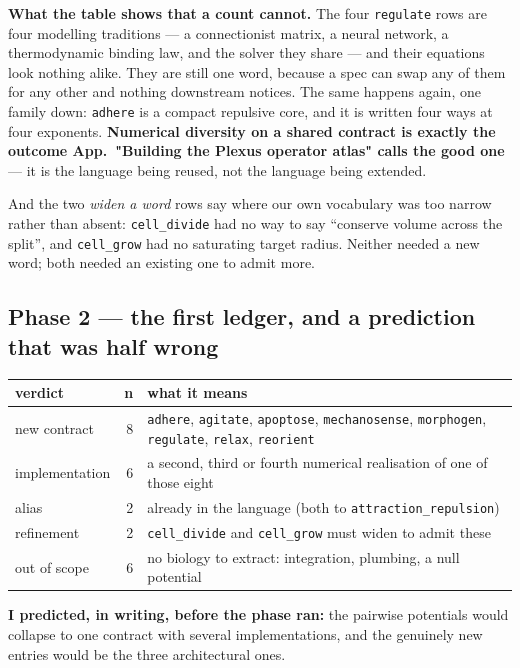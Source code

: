 \documentclass[11pt,a4paper]{article}
\newcommand{\code}[1]{\texttt{#1}}
\begin{document}


\textbf{What the table shows that a count cannot.} The four \code{regulate} rows are four
modelling traditions --- a connectionist matrix, a neural network, a thermodynamic binding law,
and the solver they share --- and their equations look nothing alike. They are still one word,
because a spec can swap any of them for any other and nothing downstream notices. The same
happens again, one family down: \code{adhere} is a compact repulsive core, and it is written four
ways at four exponents. \textbf{Numerical diversity on a shared contract is exactly the outcome
App.~"Building the Plexus operator atlas" calls the good one} --- it is the language being reused, not the language being
extended.

And the two \emph{widen a word} rows say where our own vocabulary was too narrow rather than
absent: \code{cell\_divide} had no way to say ``conserve volume across the split'', and
\code{cell\_grow} had no saturating target radius. Neither needed a new word; both needed an
existing one to admit more.

\subsection{Phase 2 --- the first ledger, and a prediction that was half wrong}

\begin{center}
\small
\begin{tabular}{@{}l r p{8.6cm}@{}}
\toprule
\textbf{verdict} & \textbf{n} & \textbf{what it means}\\
\midrule
new contract & 8 & \code{adhere}, \code{agitate}, \code{apoptose}, \code{mechanosense},
\code{morphogen}, \code{regulate}, \code{relax}, \code{reorient}\\
implementation & 6 & a second, third or fourth numerical realisation of one of those eight\\
alias & 2 & already in the language (both to \code{attraction\_repulsion})\\
refinement & 2 & \code{cell\_divide} and \code{cell\_grow} must widen to admit these\\
out of scope & 6 & no biology to extract: integration, plumbing, a null potential\\
\bottomrule
\end{tabular}
\end{center}

\textbf{I predicted, in writing, before the phase ran:} the pairwise potentials would collapse to
one contract with several implementations, and the genuinely new entries would be the three
architectural ones.
\end{document}
